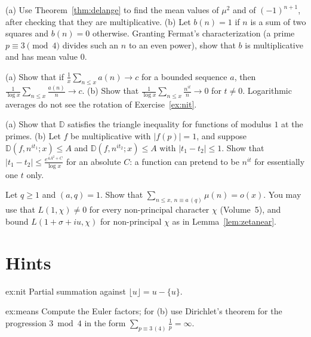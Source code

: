 \begin{exercise}[$\star$]\label{ex:means}
(a) Use Theorem~\ref{thm:delange} to find the mean values of $\mu^2$ and of $(-1)^{n+1}$, after checking that they are multiplicative.
(b) Let $b(n)=1$ if $n$ is a sum of two squares and $b(n)=0$ otherwise. Granting Fermat's characterization (a prime $p\equiv3\pmod4$ divides such an $n$ to an even power), show that $b$ is multiplicative and has mean value $0$.
\end{exercise}

\begin{exercise}[$\star\star$]\label{ex:logmean}
(a) Show that if $\frac1x\sum_{n\le x}a(n)\to c$ for a bounded sequence $a$, then $\frac1{\log x}\sum_{n\le x}\frac{a(n)}n\to c$.
(b) Show that $\frac1{\log x}\sum_{n\le x}\frac{n^{it}}n\to0$ for $t\ne0$. Logarithmic averages do not see the rotation of Exercise~\ref{ex:nit}.
\end{exercise}

\begin{exercise}[$\star\star$]\label{ex:repulsion}
(a) Show that $\mathbb D$ satisfies the triangle inequality for functions of modulus $1$ at the primes.
(b) Let $f$ be multiplicative with $|f(p)|=1$, and suppose $\mathbb D(f,n^{it_1};x)\le A$ and $\mathbb D(f,n^{it_2};x)\le A$ with $|t_1-t_2|\le1$. Show that $|t_1-t_2|\le\frac{e^{4A^2+C}}{\log x}$ for an absolute $C$: a function can pretend to be $n^{it}$ for essentially one $t$ only.
\end{exercise}

\begin{exercise}[$\star\star\star$]\label{ex:mobiusap}
Let $q\ge1$ and $(a,q)=1$. Show that $\sum_{n\le x,\,n\equiv a\,(q)}\mu(n)=o(x)$. You may use that $L(1,\chi)\ne0$ for every non-principal character $\chi$ (Volume~5), and bound $L(1+\sigma+iu,\chi)$ for non-principal $\chi$ as in Lemma~\ref{lem:zetanear}.
\end{exercise}

\section{Hints}

\begin{hint}{ex:nit}
Partial summation against $\lfloor u\rfloor=u-\{u\}$.
\end{hint}

\begin{hint}{ex:means}
Compute the Euler factors; for (b) use Dirichlet's theorem for the progression $3\bmod4$ in the form $\sum_{p\equiv3\,(4)}\frac1p=\infty$.
\end{hint}

